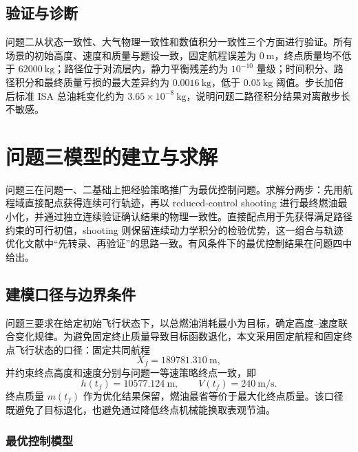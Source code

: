 \documentclass[withoutpreface,bwprint]{cumcmthesis}
\begin{document}
\subsection{验证与诊断}

问题二从状态一致性、大气物理一致性和数值积分一致性三个方面进行验证。所有场景的初始高度、速度和质量与题设一致，固定航程误差为 $0\ \mathrm{m}$，终点质量均不低于 $62000\ \mathrm{kg}$；路径位于对流层内，静力平衡残差约为 $10^{-10}$ 量级；时间积分、路径积分和最终质量亏损的最大差异约为 $0.0016\ \mathrm{kg}$，低于 $0.05\ \mathrm{kg}$ 阈值。步长加倍后标准 ISA 总油耗变化约为 $3.65\times10^{-8}\ \mathrm{kg}$，说明问题二路径积分结果对离散步长不敏感。

\section{问题三模型的建立与求解}

问题三在问题一、二基础上把经验策略推广为最优控制问题。求解分两步：先用航程域直接配点获得连续可行轨迹，再以 reduced-control shooting 进行最终燃油最小化，并通过独立连续验证确认结果的物理一致性。直接配点用于先获得满足路径约束的可行初值，shooting 则保留连续动力学积分的检验优势，这一组合与轨迹优化文献中“先转录、再验证”的思路一致\cite{hargraves,betts}。有风条件下的最优控制结果在问题四中给出。

\subsection{建模口径与边界条件}

问题三要求在给定初始飞行状态下，以总燃油消耗最小为目标，确定高度--速度联合变化规律\cite{cook,cots2022}。为避免固定终止质量导致目标函数退化，本文采用固定航程和固定终点飞行状态的口径：固定共同航程
\[
X_f=189781.310\ \mathrm{m},
\]
并约束终点高度和速度分别与问题一等速策略终点一致，即
\[
h(t_f)=10577.124\ \mathrm{m},\qquad V(t_f)=240\ \mathrm{m/s}.
\]
终点质量 $m(t_f)$ 作为优化结果保留，燃油最省等价于最大化终点质量。该口径既避免了目标退化，也避免通过降低终点机械能换取表观节油。

\subsubsection{最优控制模型}
\end{document}
